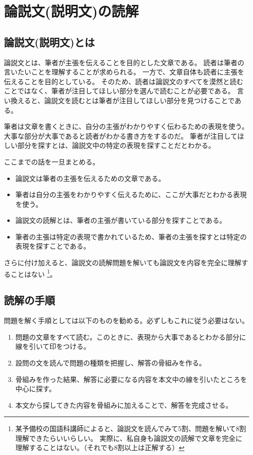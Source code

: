 \documentclass{tarticle}
\begin{document}
	\section{論説文(説明文)の読解}

	\subsection{論説文(説明文)とは}

	論説文とは、筆者が主張を伝えることを目的とした文章である。
	読者は筆者の言いたいことを理解することが求められる。
    一方で、文章自体も読者に主張を伝えることを目的としている。
	そのため、読者は論説文のすべてを漠然と読むことではなく、筆者が注目してほしい部分を選んで読むことが必要である。
    言い換えると、論説文を読むとは筆者が注目してほしい部分を見つけることである。

    筆者は文章を書くときに、自分の主張がわかりやすく伝わるための表現を使う。
    大事な部分が大事であると読者がわかる書き方をするのだ。
    筆者が注目してほしい部分を探すとは、論説文中の特定の表現を探すことだとわかる。

    ここまでの話を一旦まとめる。
    \begin{itemize}
        \item 論説文は筆者の主張を伝えるための文章である。
        \item 筆者は自分の主張をわかりやすく伝えるために、ここが大事だとわかる表現を使う。
        \item 論説文の読解とは、筆者の主張が書いている部分を探すことである。
        \item 筆者の主張は特定の表現で書かれているため、筆者の主張を探すとは特定の表現を探すことである。
    \end{itemize}
    さらに付け加えると、論説文の読解問題を解いても論説文を内容を完全に理解することはない
    \footnote{某予備校の国語科講師によると、論説文を読んでみて5割、問題を解いて8割理解できたらいいらしい。
    実際に、私自身も論説文の読解で文章を完全に理解することはない。（それでも8割以上は正解する）}。



	\subsection{読解の手順}

	問題を解く手順としては以下のものを勧める。必ずしもこれに従う必要はない。

	\begin{enumerate}
		\item 問題の文章をすべて読む。このときに、表現から大事であるとわかる部分に線を引いて印をつける。
		\item 設問の文を読んで問題の種類を把握し、解答の骨組みを作る。
		\item 骨組みを作った結果、解答に必要になる内容を本文中の線を引いたところを中心に探す。
		\item 本文から探してきた内容を骨組みに加えることで、解答を完成させる。
	\end{enumerate}
\end{document}
